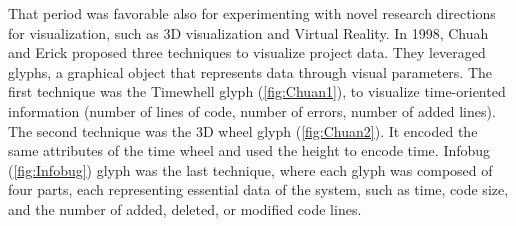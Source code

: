 That period was favorable also for experimenting with novel research directions for visualization, 
such as 3D visualization and Virtual Reality. 
In 1998, Chuah and Erick \cite{Chuah1998} proposed three techniques to visualize project data. 
They leveraged glyphs, a graphical object that represents data through visual parameters. 
The first technique was the Timewhell glyph (\autoref{fig:Chuan1}), to visualize time-oriented information (number of lines of code, number of errors, number of added lines). 
The second technique was the 3D wheel glyph (\autoref{fig:Chuan2}). It encoded the same attributes of the time wheel and used the height to encode time. 
Infobug (\autoref{fig:Infobug}) glyph was the last technique, where each glyph was composed of four parts, each representing essential data of the system, such as time, code size, and the number of added, deleted, or modified code lines. \newline

